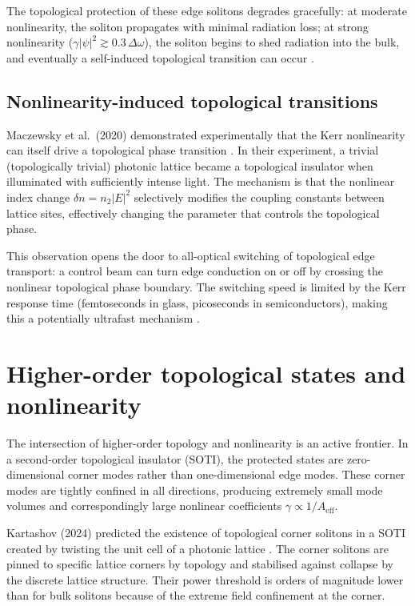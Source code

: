 The topological protection of these edge solitons degrades gracefully:
at moderate nonlinearity, the soliton propagates with minimal
radiation loss; at strong nonlinearity ($\gamma|\psi|^2 \gtrsim
0.3\,\Delta\omega$), the soliton begins to shed radiation into
the bulk, and eventually a self-induced topological transition can
occur \cite{szameit2020nonlinearity}.

\subsection{Nonlinearity-induced topological transitions}
\label{sec:ch18-nl-transition}

Maczewsky et al.\ (2020) demonstrated experimentally that the Kerr
nonlinearity can itself drive a topological phase transition
\cite{szameit2020nonlinearity}.  In their experiment, a trivial
(topologically trivial) photonic lattice became a topological
insulator when illuminated with sufficiently intense light.  The
mechanism is that the nonlinear index change $\delta n = n_2 |E|^2$
selectively modifies the coupling constants between lattice sites,
effectively changing the parameter that controls the topological
phase.

This observation opens the door to all-optical switching of
topological edge transport: a control beam can turn edge conduction
on or off by crossing the nonlinear topological phase boundary.
The switching speed is limited by the Kerr response time (femtoseconds
in glass, picoseconds in semiconductors), making this a potentially
ultrafast mechanism \cite{chen2025nonlinear}.

\section{Higher-order topological states and nonlinearity}
\label{sec:ch18-hoti-nonlinear}

The intersection of higher-order topology and nonlinearity is an
active frontier.  In a second-order topological insulator (SOTI), the
protected states are zero-dimensional corner modes rather than
one-dimensional edge modes.  These corner modes are tightly confined
in all directions, producing extremely small mode volumes and
correspondingly large nonlinear coefficients $\gamma \propto
1/A_{\mathrm{eff}}$.

Kartashov (2024) predicted the existence of topological corner
solitons in a SOTI created by twisting the unit cell of a photonic
lattice \cite{kartashov2024solitons}.  The corner solitons are
pinned to specific lattice corners by topology and stabilised
against collapse by the discrete lattice structure.  Their power
threshold is orders of magnitude lower than for bulk solitons because
of the extreme field confinement at the corner.

